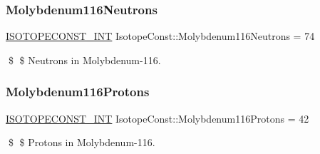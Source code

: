 \subsubsection{\texorpdfstring{Molybdenum116\+Neutrons}{Molybdenum116Neutrons}}
{\footnotesize\ttfamily \mbox{\hyperlink{group___isotope_const-_macros_ga5f18360b3e99483a35c32d789e62621c}{I\+S\+O\+T\+O\+P\+E\+C\+O\+N\+S\+T\+\_\+\+I\+NT}} Isotope\+Const\+::\+Molybdenum116\+Neutrons = 74}

\$ \$ Neutrons in Molybdenum-\/116. \mbox{\label{group___isotope_const-_molybdenum-_mo116_gaf7d1631cc40f42c36d7a3e302626c304}} 
\subsubsection{\texorpdfstring{Molybdenum116\+Protons}{Molybdenum116Protons}}
{\footnotesize\ttfamily \mbox{\hyperlink{group___isotope_const-_macros_ga5f18360b3e99483a35c32d789e62621c}{I\+S\+O\+T\+O\+P\+E\+C\+O\+N\+S\+T\+\_\+\+I\+NT}} Isotope\+Const\+::\+Molybdenum116\+Protons = 42}

\$ \$ Protons in Molybdenum-\/116. 